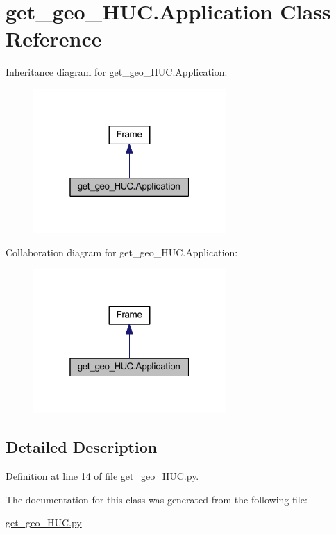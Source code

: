 \hypertarget{classget__geo___h_u_c_1_1_application}{}\section{get\+\_\+geo\+\_\+\+H\+U\+C.\+Application Class Reference}
\label{classget__geo___h_u_c_1_1_application}


Inheritance diagram for get\+\_\+geo\+\_\+\+H\+U\+C.\+Application\+:
\nopagebreak
\begin{figure}[H]
\begin{center}
\leavevmode
\includegraphics[width=208pt]{classget__geo___h_u_c_1_1_application__inherit__graph}
\end{center}
\end{figure}


Collaboration diagram for get\+\_\+geo\+\_\+\+H\+U\+C.\+Application\+:
\nopagebreak
\begin{figure}[H]
\begin{center}
\leavevmode
\includegraphics[width=208pt]{classget__geo___h_u_c_1_1_application__coll__graph}
\end{center}
\end{figure}


\subsection{Detailed Description}


Definition at line 14 of file get\+\_\+geo\+\_\+\+H\+U\+C.\+py.



The documentation for this class was generated from the following file\+:\begin{DoxyCompactItemize}
\item 
\hyperlink{get__geo___h_u_c_8py}{get\+\_\+geo\+\_\+\+H\+U\+C.\+py}\end{DoxyCompactItemize}

